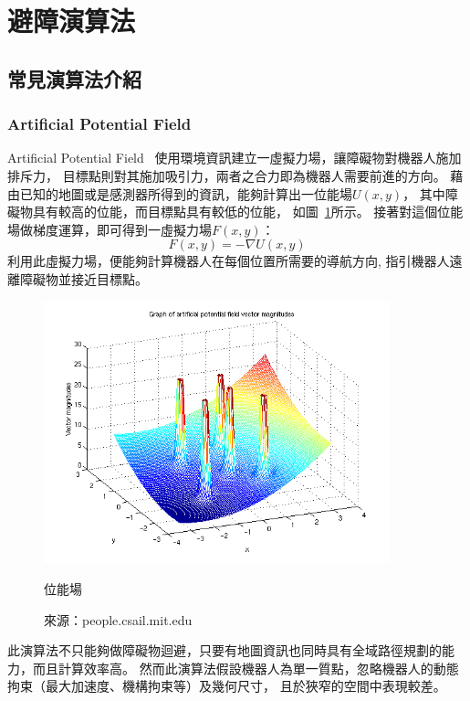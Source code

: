 \section{避障演算法}
\label{sec:vfhplus}

\subsection{常見演算法介紹}

\subsubsection{Artificial Potential Field}
Artificial Potential Field~\cite{Khatib:1985:APF}
使用環境資訊建立一虛擬力場，讓障礙物對機器人施加排斥力，
目標點則對其施加吸引力，兩者之合力即為機器人需要前進的方向。
藉由已知的地圖或是感測器所得到的資訊，能夠計算出一位能場$U(x,y)$，
其中障礙物具有較高的位能，而目標點具有較低的位能，
如圖~\ref{f:potential_field}所示。
接著對這個位能場做梯度運算，即可得到一虛擬力場$F(x,y)$：
\begin{equation}
	F(x,y) = -\nabla U(x,y)
\end{equation}
利用此虛擬力場，便能夠計算機器人在每個位置所需要的導航方向, 
指引機器人遠離障礙物並接近目標點。
\begin{figure}[h!]
	\centering
	\includegraphics[width=10cm]{figures/demo_apf_whitebg}
	\caption{位能場}
	\caption*{來源：people.csail.mit.edu}
	\label{f:potential_field}
\end{figure}

此演算法不只能夠做障礙物迴避，只要有地圖資訊也同時具有全域路徑規劃的能力，而且計算效率高。
然而此演算法假設機器人為單一質點，忽略機器人的動態拘束（最大加速度、機構拘束等）及幾何尺寸，
且於狹窄的空間中表現較差。

